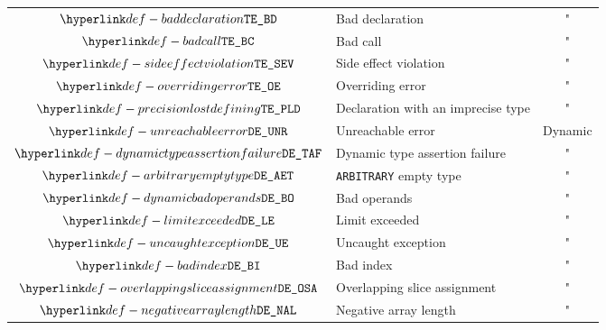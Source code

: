\begin{center}
\begin{tabular}{clc}
  $\BadDeclaration$              & Bad declaration                & "             \\
  $\BadCall$                     & Bad call                       & "             \\
  $\SideEffectViolation$         & Side effect violation          & "             \\
  $\OverridingError$             & Overriding error               & "             \\
  $\PrecisionLostDefining$       & Declaration with an imprecise type & "         \\
  \hline
  $\UnreachableError$            & Unreachable error              & Dynamic       \\
  $\DynamicTypeAssertionFailure$ & Dynamic type assertion failure & "             \\
  $\ArbitraryEmptyType$          & \texttt{ARBITRARY} empty type  & "             \\
  $\DynamicBadOperands$          & Bad operands                   & "             \\
  $\LimitExceeded$               & Limit exceeded                 & "             \\
  $\UncaughtException$           & Uncaught exception             & "             \\
  $\BadIndex$                    & Bad index                      & "             \\
  $\OverlappingSliceAssignment$  & Overlapping slice assignment   & "             \\
  $\NegativeArrayLength$         & Negative array length          & "             \\
\end{tabular}
\end{center}


